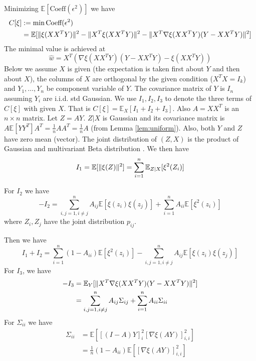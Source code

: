 \documentclass{article}
\DeclarePairedDelimiter\norm{\lVert}{\rVert}
\def\E{\mathbb{E}}
\begin{document}
Minimizing $\E[\textrm{Coeff}(\epsilon^2)]$ we have
\begin{align*}
C[\xi] &:= \min \textrm{Coeff}(\epsilon^2) \\
&=
\E[\norm{\xi(XX^TY)}^2 -
\norm{X^T\xi(XX^TY)}^2 -
\norm{X^T \nabla\xi(XX^TY)(Y-XX^TY)}^2]
\end{align*}
The minimal value is achieved at
$$
\hat{w} =  X^T(\nabla\xi(XX^T Y)
(Y-XX^T Y) - \xi(XX^T Y))
$$
Below we assume $X$ is given
(the expectation is taken first about $Y$ and then about $X$),
the columns of $X$ are orthogonal by the given condition
($X^TX=I_k$) and
$Y_1, \dots, Y_n $ be component variable of $Y$.
The covariance matrix of $Y$ is $I_n$ assuming $Y_i$ are i.i.d. std Gaussian.
We use $I_1, I_2, I_3$ to denote
the three terms of $C[\xi]$ with given $X$. That is
$C[\xi] = \E_X[I_1 + I_2 + I_3]$.
Also $A=XX^T$ is an $n\times n$ matrix.
Let $Z = AY$. $Z | X$ is Gaussian and
its covariance matrix is
$A\E[YY^T]A^T = \frac{1}{n}AA^T = \frac{1}{n}A$
(from Lemma \ref{lem:uniform}).
Also, both $Y$ and $Z$ have zero mean (vector). The joint distribution of $(Z, X)$ is the product of Gaussian and multivariant Beta distribution \cite{eaton1989group}.
We then have
\begin{equation*}
I_1 =\E[\norm{\xi(Z)}^2] = \sum_{i=1}^n \E_{Z|X}[\xi^2(Z_i)]
\end{equation*}

For $I_2$
we have
\begin{equation*}
-I_2 = \sum_{i,j=1, i \neq j}^n A_{ij}\E[\xi(z_i)\xi(z_j)] +
\sum_{i=1}^n A_{ii}  \E[\xi^2(z_i)]
\end{equation*}
where $Z_i, Z_j$ have the joint distribution $p_{ij}$.

Then we have
\begin{equation}\label{eq:I1plusI2}
I_1+ I_2 = \sum_{i=1}^n (1-A_{ii}) \E[\xi^2(z_i)] -
\sum_{i,j=1, i \neq j}^n A_{ij}\E[\xi(z_i)\xi(z_j)]
\end{equation}
For $I_3$, we have
\begin{align*}
-I_3 & = \E_Y[\norm{X^T \nabla\xi(XX^TY)(Y-XX^TY)}^2] \\
& = \sum_{i,j=1, i \neq j}^n A_{ij}\Sigma_{ij} +
\sum_{i=1}^n A_{ii}\Sigma_{ii}
\end{align*}
For $\Sigma_{ii}$ we have
\begin{align}\label{eq:sigmaii}
\Sigma_{ii} &=  \E[ [(I-A)Y]_i^2 [\nabla \xi(AY)]_{i,i}^2] \\
&= \frac{1}{n}(1-A_{ii}) \E[ [\nabla \xi(AY)]_{i,i}^2]
\end{align}
\end{document}

